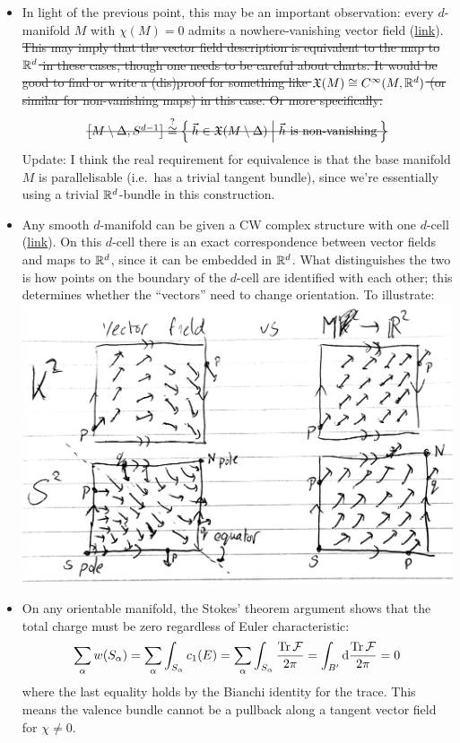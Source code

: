 {\begin{itemize}
	\item In light of the previous point, this may be an important observation: every $d$-manifold $M$ with $\chi(M)=0$ admits a nowhere-vanishing vector field (\href{https://math.stackexchange.com/questions/47370/if-a-manifold-m-has-zero-euler-characteristic-there-is-a-non-vanishing-vector-f}{link}). \st{This may imply that the vector field description is equivalent to the map to $\mathbb{R}^d$ in these cases, though one needs to be careful about charts. It would be good to find or write a (dis)proof for something like $\mathfrak{X}(M)\cong C^\infty(M,\mathbb{R}^d)$ (or similar for non-vanishing maps) in this case. Or more specifically:}
	\[
		\st{\big[M\setminus\Delta,S^{d-1}\big] \stackrel{?}{\cong} \Set{\vec{h}\in\vct(M\setminus\Delta) | \text{$\vec{h}$ is non-vanishing}}}
	\]
	Update: I think the real requirement for equivalence is that the base manifold $M$ is parallelisable (i.e.\ has a trivial tangent bundle), since we're essentially using a trivial $\mathbb{R}^d$-bundle in this construction.
	
	\item Any smooth $d$-manifold can be given a CW complex structure with one $d$-cell (\href{https://mathoverflow.net/questions/120799/manifolds-admitting-cw-structure-with-single-n-cell}{link}). On this $d$-cell there is an exact correspondence between vector fields and maps to $\mathbb{R}^d$, since it can be embedded in $\mathbb{R}^d$. What distinguishes the two is how points on the boundary of the $d$-cell are identified with each other; this determines whether the ``vectors'' need to change orientation. To illustrate:
	\includegraphics[width=.9\textwidth]{Images/vectorfield-vs-map}
	
	\item On any orientable manifold, the Stokes' theorem argument shows that the total charge must be zero regardless of Euler characteristic:
	\[
		\sum_{\alpha}w(S_\alpha) = \sum_{\alpha}\int_{S_\alpha} c_1(E) = \sum_{\alpha}\int_{S_\alpha}\frac{\Tr\mathcal{F}}{2\pi} = \int_{B'} \dd{\frac{\Tr\mathcal{F}}{2\pi}} = 0
	\]
	where the last equality holds by the Bianchi identity for the trace. This means the valence bundle cannot be a pullback along a tangent vector field for $\chi\neq0$.
	

\end{itemize}}
